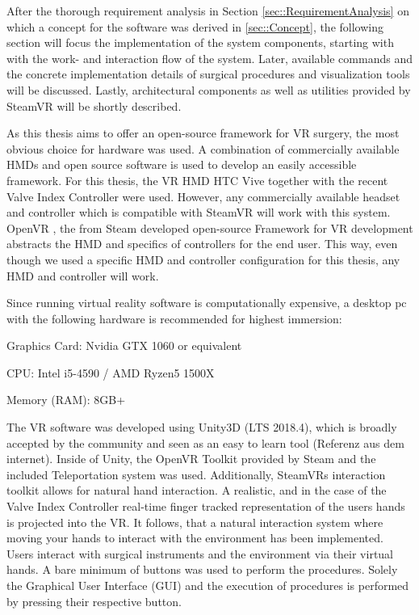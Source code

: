 After the thorough requirement analysis in Section \ref{sec::RequirementAnalysis} on which a concept for the software was derived in \ref{sec::Concept}, 
the following section will focus the implementation of the system components, starting with with the work- and interaction flow of the system.
Later, available commands and the concrete implementation details of surgical procedures and visualization tools will be discussed.
Lastly, architectural components as well as utilities provided by SteamVR will be shortly described.

As this thesis aims to offer an open-source framework for VR surgery, the most obvious choice for hardware was used.
A combination of commercially available HMDs and open source software is used to develop an easily accessible framework.
For this thesis, the VR HMD HTC Vive \cite{Vive} together with the recent Valve Index Controller \cite{ValveIndex} were used.
However, any commercially available headset and controller which is compatible with SteamVR will work with this system.
OpenVR \cite{OpenVR}, the from Steam developed open-source Framework for VR development abstracts the HMD and specifics of controllers for the end user.
This way, even though we used a specific HMD and controller configuration for this thesis, any HMD and controller will work.

Since running virtual reality software is computationally expensive, a desktop pc with the following hardware is recommended for highest immersion:

\begin{compactenum}[label=(\alph*)]
    \item Graphics Card: Nvidia GTX 1060 or equivalent
    \item CPU: Intel i5-4590 / AMD Ryzen5 1500X
    \item Memory (RAM): 8GB+
\end{compactenum}

The VR software was developed using Unity3D (LTS 2018.4), which is broadly accepted by the community and seen as an easy to learn tool (Referenz aus dem internet).
Inside of Unity, the OpenVR Toolkit provided by Steam and the included Teleportation system was used.
Additionally, SteamVRs interaction toolkit allows for natural hand interaction.
A realistic, and in the case of the Valve Index Controller real-time finger tracked representation of the users hands is projected into the VR.
It follows, that a natural interaction system where moving your hands to interact with the environment has been implemented.
Users interact with surgical instruments and the environment via their virtual hands.
A bare minimum of buttons was used to perform the procedures.
Solely the Graphical User Interface (GUI) and the execution of procedures is performed by pressing their respective button.

